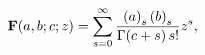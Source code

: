 \[\mathop{\mathbf{F}\/}\nolimits\!\left(a,b;c;z\right)=\sum_{s=0}^{\infty}\frac{%
\left(a\right)_{s}\left(b\right)_{s}}{\mathop{\Gamma\/}\nolimits\!\left(c+s%
\right)s!}z^{s},\]